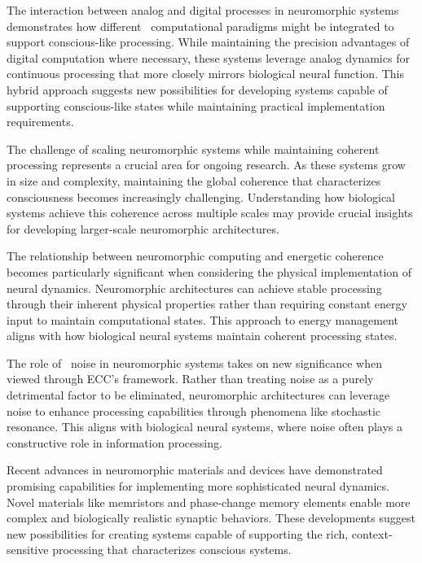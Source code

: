 The interaction between analog and digital processes in neuromorphic systems demonstrates how different~ computational paradigms might be integrated to support conscious-like processing. While maintaining the precision advantages of~ digital computation where necessary, these systems leverage analog dynamics for continuous processing that more closely mirrors biological neural function. This hybrid approach suggests new possibilities for developing systems capable of supporting conscious-like states while maintaining practical implementation requirements.

The challenge of scaling neuromorphic systems while maintaining coherent processing represents a crucial area for ongoing research. As these systems grow in size and complexity, maintaining the global coherence that characterizes consciousness becomes increasingly challenging. Understanding how biological systems achieve this coherence across multiple scales may provide crucial insights for developing larger-scale neuromorphic architectures.

The relationship between neuromorphic computing and energetic coherence becomes particularly significant when considering the physical implementation of neural dynamics. Neuromorphic architectures can achieve stable processing through their inherent physical properties rather than requiring constant energy input to maintain computational states. This approach to energy management aligns with how biological neural systems maintain coherent processing states.

The role of~ noise in neuromorphic systems takes on new significance when viewed through ECC's framework. Rather than treating noise as a purely detrimental factor to be eliminated, neuromorphic architectures can leverage noise to enhance processing capabilities through phenomena like stochastic resonance. This aligns with biological neural systems, where noise often plays a constructive role in information processing.

Recent advances in neuromorphic materials and devices have demonstrated promising capabilities for implementing more sophisticated neural dynamics. Novel materials like memristors and phase-change memory elements enable more complex and biologically realistic synaptic behaviors. These developments suggest new possibilities for creating systems capable of supporting the rich, context-sensitive processing that characterizes conscious systems.

